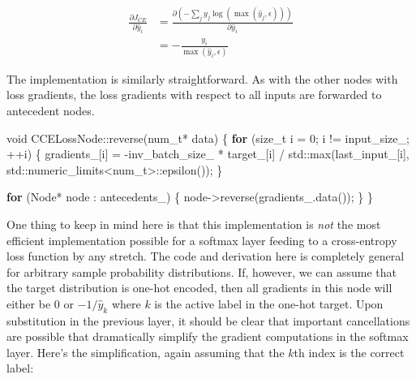 \documentclass[
]{article}
\newenvironment{Shaded}{}{}
\newcommand{\BuiltInTok}[1]{#1}
\newcommand{\ControlFlowTok}[1]{\textcolor[rgb]{0.00,0.44,0.13}{\textbf{#1}}}
\newcommand{\DataTypeTok}[1]{\textcolor[rgb]{0.56,0.13,0.00}{#1}}
\newcommand{\DecValTok}[1]{\textcolor[rgb]{0.25,0.63,0.44}{#1}}
\newcommand{\NormalTok}[1]{#1}
\newcommand{\VariableTok}[1]{\textcolor[rgb]{0.10,0.09,0.49}{#1}}
\begin{document}
\[
\begin{aligned}
\frac{\partial J_{CE}}{\partial{\hat{y}_i}} &= \frac{\partial \left(-\sum_j y_j\log{\left(\max(\hat{y}_j, \epsilon)\right)}\right)}{\partial \hat{y}_i} \\
&= -\frac{y_i}{\max(\hat{y}_i, \epsilon)}
\end{aligned}
\]

The implementation is similarly straightforward. As with the other nodes
with loss gradients, the loss gradients with respect to all inputs are
forwarded to antecedent nodes.

\begin{Shaded}
\begin{Highlighting}[]
\DataTypeTok{void}\NormalTok{ CCELossNode::reverse(}\DataTypeTok{num\_t}\NormalTok{* data)}
\NormalTok{\{}
    \ControlFlowTok{for}\NormalTok{ (}\DataTypeTok{size\_t}\NormalTok{ i = }\DecValTok{0}\NormalTok{; i != }\VariableTok{input\_size\_}\NormalTok{; ++i)}
\NormalTok{    \{}
        \VariableTok{gradients\_}\NormalTok{[i] = {-}}\VariableTok{inv\_batch\_size\_}\NormalTok{ * }\VariableTok{target\_}\NormalTok{[i]}
\NormalTok{            / }\BuiltInTok{std::}\NormalTok{max(}\VariableTok{last\_input\_}\NormalTok{[i], }\BuiltInTok{std::}\NormalTok{numeric\_limits\textless{}}\DataTypeTok{num\_t}\NormalTok{\textgreater{}::epsilon());}
\NormalTok{    \}}

    \ControlFlowTok{for}\NormalTok{ (Node* node : }\VariableTok{antecedents\_}\NormalTok{)}
\NormalTok{    \{}
\NormalTok{        node{-}\textgreater{}reverse(}\VariableTok{gradients\_}\NormalTok{.data());}
\NormalTok{    \}}
\NormalTok{\}}
\end{Highlighting}
\end{Shaded}

One thing to keep in mind here is that this implementation is \emph{not}
the most efficient implementation possible for a softmax layer feeding
to a cross-entropy loss function by any stretch. The code and derivation
here is completely general for arbitrary sample probability
distributions. If, however, we can assume that the target distribution
is one-hot encoded, then all gradients in this node will either be 0 or
\(-1/\hat{y}_k\) where \(k\) is the active label in the one-hot target.
Upon substitution in the previous layer, it should be clear that
important cancellations are possible that dramatically simplify the
gradient computations in the softmax layer. Here's the simplification,
again assuming that the \(k\)th index is the correct label:
\end{document}
